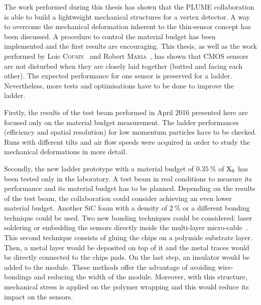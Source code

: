 
The work performed during this thesis has shown that the \gls{PLUME} collaboration is able to build a lightweight mechanical structures for a vertex detector.
A way to overcome the mechanical deformation inherent to the thin-sensor concept has been discussed.
A procedure to control the material budget has been implemented and the first results are encouraging.
This thesis, as well as the work performed by Loic \textsc{Cousin}~\cite{cousin} and Robert \textsc{Maria}~\cite{maria}, has shown that \gls{CMOS} sensors are not disturbed when they are closely laid together (butted and facing each other).
The expected performance for one sensor is preserved for a ladder.
Nevertheless, more tests and optimisations have to be done to improve the ladder.

Firstly, the results of the test beam performed in April 2016 presented here are focused only on the material budget measurement.
The ladder performances (efficiency and spatial resolution) for low momentum particles have to be checked.
Runs with different tilts and air flow speeds were acquired in order to study the mechanical deformations in more detail.

Secondly, the new ladder prototype with a material budget of $0.35~\%$ of $\rm{X_{0}}$ has been tested only in the laboratory.
A test beam in real conditions to measure its performance and its material budget has to be planned.
Depending on the results of the test beam, the collaboration could consider achieving an even lower material budget.
Another \gls{SiC} foam with a density of $2~\%$ or a different bonding technique could be used.
Two new bonding  techniques could be considered: laser soldering or embedding the sensors directly inside the multi-layer micro-cable~\cite{Baudot2012}.
This second technique consists of gluing the chips on a polymide substrate layer.
Then, a metal layer would be deposited on top of it and the metal traces would be directly connected to the chips pads.
On the last step, an insulator would be added to the module.
These methods offer the advantage of avoiding wire-bondings and reducing the width of the module.
Moreover, with this structure, mechanical stress is applied on the polymer wrapping and this would reduce its impact on the sensors.

